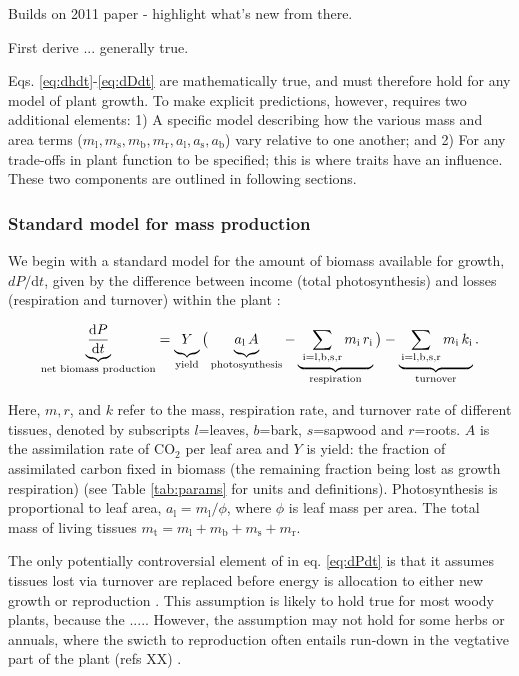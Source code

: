 \documentclass[12pt, a4paper]{article}
\begin{document}
Builds on 2011 paper - highlight what's new from there.

First derive ... generally true.

Eqs. \ref{eq:dhdt}-\ref{eq:dDdt} are mathematically true, and must
therefore hold for any model of plant growth. To make explicit
predictions, however, requires two additional elements: 1) A specific
model describing how the various mass and area terms
($m_\textrm{l}, m_\textrm{s}, m_\textrm{b}, m_\textrm{r}, a_\textrm{l}, a_\textrm{s}, a_\textrm{b}$)
vary relative to one another; and 2) For any trade-offs in plant
function to be specified; this is where traits have an influence.  These two components are outlined in following sections.

\subsubsection{Standard model for mass production}

We begin with a standard model for the amount of biomass available for
growth, $dP / \textrm{d}t$, given by the difference between income
(total photosynthesis) and losses (respiration and turnover) within the
plant \citep{makela-1997, Thornley-2000, falster-2011}:

\begin{equation}\label{eq:dPdt}
\underbrace{\strut \frac{\textrm{d}P}{\textrm{d}t}}_\textrm{net biomass production}
  = \underbrace{\strut Y}_\textrm{yield}
    \big( \underbrace{\strut a_\textrm{l} \, A}_\textrm{photosynthesis} -
     \underbrace{\strut \,\sum_\textrm{i=l,b,s,r}{m_\textrm{i} \, r_\textrm{i}}}_\textrm{respiration}\big)
    - \underbrace{\strut \sum_\textrm{i=l,b,s,r}{m_\textrm{i} \, k_\textrm{i}}}_\textrm{turnover}.
\end{equation}

Here, $m,r$, and $k$ refer to the mass, respiration rate, and
turnover rate of different tissues, denoted by subscripts $l$=leaves,
$b$=bark, $s$=sapwood and $r$=roots. $A$ is the assimilation
rate of CO$_2$ per leaf area and $Y$ is yield: the fraction of
assimilated carbon fixed in biomass (the remaining fraction being lost
as growth respiration) (see Table \ref{tab:params} for units and
definitions). Photosynthesis is proportional to leaf area,
$a_\textrm{l} = m_\textrm{l} / \phi$, where $\phi$ is leaf mass per area.
The total mass of living tissues $m_\textrm{t}=m_\textrm{l}+m_\textrm{b}+m_\textrm{s}+m_\textrm{r}.$

The only potentially controversial element of in eq. \ref{eq:dPdt} is that it assumes tissues lost via turnover are replaced before energy is allocation to either new growth or reproduction \citep{Thornley-2000}. This assumption is likely to hold true for most woody plants, because the ..... However, the assumption may not hold for some herbs or annuals, where the swicth to reproduction often entails run-down in the vegtative part of the plant (refs XX) \citep{ Thornley-2000}.
\end{document}
